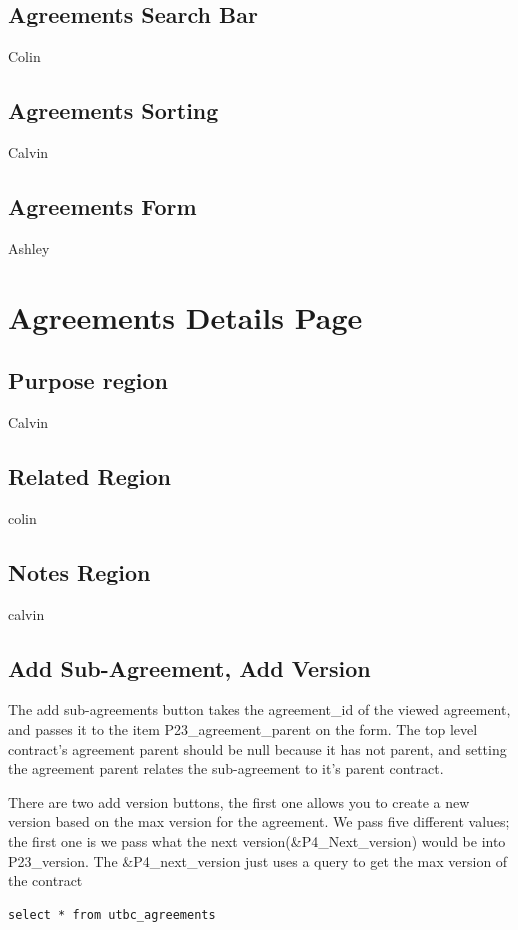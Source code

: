 \documentclass{report}
\begin{document}
\subsection{Agreements Search Bar}
Colin 

\subsection{Agreements Sorting}
Calvin

\subsection{Agreements Form}
Ashley

\section{Agreements Details Page}

\subsection{Purpose region}
Calvin

\subsection{Related Region}
colin

\subsection{Notes Region}
calvin

\subsection{Add Sub-Agreement, Add Version}
The add sub-agreements button takes the agreement\_id of the viewed agreement, and passes it to the item P23\_agreement\_parent on the form. The top level contract's agreement parent should be null because it has not parent, and setting the agreement parent relates the sub-agreement to it's parent contract.

There are two add version buttons, the first one allows you to create a new version based on the max version for the agreement. We pass five different values; the first one is we pass what the next version(\&P4\_Next\_version) would be into P23\_version. The \&P4\_next\_version just uses a query to get the max version of the contract

\begin{lstlisting}
select * from utbc_agreements
\end{lstlisting}
\end{document}
